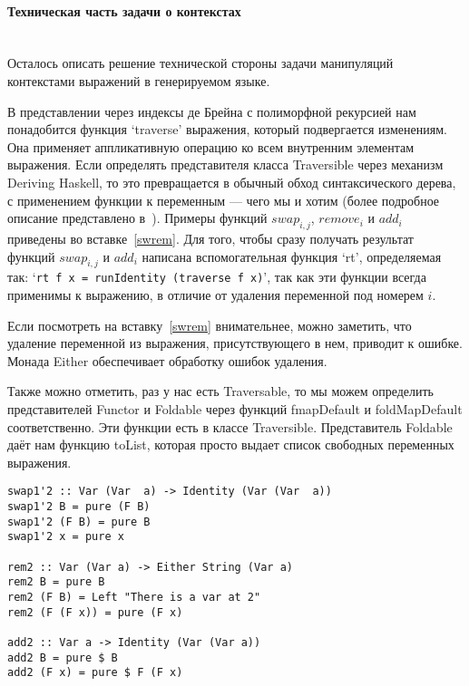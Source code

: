 \paragraph{Техническая часть задачи о контекстах} \hspace{0pt} \\

Осталось описать решение технической стороны задачи манипуляций контекстами выражений в генерируемом языке.

В представлении через индексы де Брейна с полиморфной рекурсией нам понадобится функция `traverse' выражения, который подвергается изменениям. Она применяет аппликативную операцию ко всем внутренним элементам выражения. Если определять представителя класса Traversible через механизм Deriving Haskell\cite{deriveFun}, то это превращается в обычный обход синтаксического дерева, с применением функции к переменным --- чего мы и хотим (более подробное описание представлено в~\cite{bound}). Примеры функций $swap_{i,j}$, $remove_i$ и $add_i$ приведены во вставке~\ref{swrem}. Для того, чтобы сразу получать результат функций $swap_{i,j}$ и $add_i$ написана вспомогательная функция `rt', определяемая так: `\lstinline{rt f x = runIdentity (traverse f x)}', так как эти функции всегда применимы к выражению, в отличие от удаления переменной под номерем $i$.

Если посмотреть на вставку~\ref{swrem} внимательнее, можно заметить, что удаление переменной из выражения, присутствующего в нем, приводит к ошибке. Монада Either обеспечивает обработку ошибок удаления.

Также можно отметить, раз у нас есть Traversable, то мы можем определить представителей Functor и Foldable через функций fmapDefault и foldMapDefault соответственно. Эти функции есть в классе Traversible. Представитель Foldable даёт нам функцию toList, которая просто выдает список свободных переменных выражения.

\begin{lstlisting}[label={swrem}, caption={Примеры функций $swap_{i,j}$, $remove_i$ и $add_i$},captionpos=b, frame=single, float, floatplacement=H]
swap1'2 :: Var (Var  a) -> Identity (Var (Var  a))
swap1'2 B = pure (F B)
swap1'2 (F B) = pure B
swap1'2 x = pure x

rem2 :: Var (Var a) -> Either String (Var a)
rem2 B = pure B
rem2 (F B) = Left "There is a var at 2"
rem2 (F (F x)) = pure (F x)

add2 :: Var a -> Identity (Var (Var a))
add2 B = pure $ B
add2 (F x) = pure $ F (F x)
\end{lstlisting}







